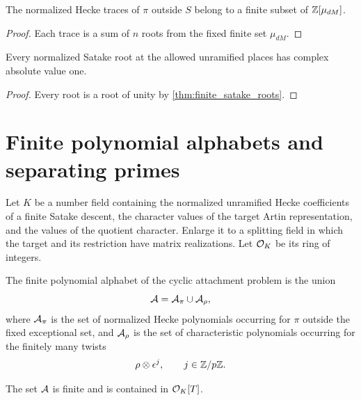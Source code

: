 \begin{corollary}\label{cor:finite_trace_alphabet}
The normalized Hecke traces of \(\pi\) outside \(S\) belong to a finite subset of \(\mathbb Z[\mu_{dM}]\).
\end{corollary}

\begin{proof}
Each trace is a sum of \(n\) roots from the fixed finite set \(\mu_{dM}\).
\end{proof}

\begin{corollary}\label{cor:unramified_ramanujan}
Every normalized Satake root at the allowed unramified places has complex absolute value one.
\end{corollary}

\begin{proof}
Every root is a root of unity by \cref{thm:finite_satake_roots}.
\end{proof}


\section{Finite polynomial alphabets and separating primes}\label{sec:separating_primes}

Let \(K\) be a number field containing the normalized unramified Hecke coefficients of a finite Satake descent, the character values of the target Artin representation, and the values of the quotient character. Enlarge it to a splitting field in which the target and its restriction have matrix realizations. Let \(\mathcal O_K\) be its ring of integers.

\begin{definition}\label{def:finite_alphabet}
The finite polynomial alphabet of the cyclic attachment problem is the union
\[
\mathcal A
=
\mathcal A_{\pi}
\cup
\mathcal A_{\rho},
\]
where \(\mathcal A_{\pi}\) is the set of normalized Hecke polynomials occurring for \(\pi\) outside the fixed exceptional set, and \(\mathcal A_{\rho}\) is the set of characteristic polynomials occurring for the finitely many twists
\[
\rho\otimes\epsilon^j,
\qquad
j\in\mathbb Z/p\mathbb Z.
\]
\end{definition}

\begin{proposition}\label{prop:finite_alphabet}
The set \(\mathcal A\) is finite and is contained in \(\mathcal O_K[T]\).
\end{proposition}

